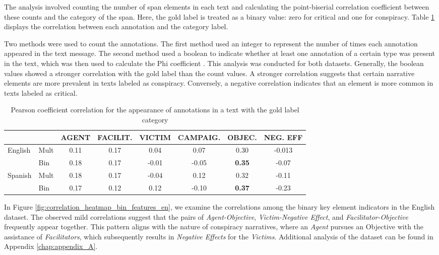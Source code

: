 \documentclass{Configuration_Files/PoliMi3i_thesis}
\begin{document}
The analysis involved counting the number of span elements in each text and calculating the point-biserial correlation coefficient \cite{brown2001point} between these counts and the category of the span. Here, the gold label is treated as a binary value: zero for critical and one for conspiracy. Table \ref{tab:pearson_coeff_corr_span_texts} displays the correlation between each annotation and the category label.

Two methods were used to count the annotations. The first method used an integer to represent the number of times each annotation appeared in the text message. The second method used a boolean to indicate whether at least one annotation of a certain type was present in the text, which was then used to calculate the Phi coefficient \cite{ekstrom2011phi}. This analysis was conducted for both datasets. Generally, the boolean values showed a stronger correlation with the gold label than the count values. A stronger correlation suggests that certain narrative elements are more prevalent in texts labeled as conspiracy. Conversely, a negative correlation indicates that an element is more common in texts labeled as critical.

\begin{table}[H]
\centering
\small
\begin{tabular}{ll|cccccc}
\hline
        &         & AGENT & FACILIT. & VICTIM & CAMPAIG. & OBJEC. & NEG. EFF    \\
\hline
English & Mult    & 0.11  & 0.17   & 0.04   & 0.07  & 0.30   & -0.013           \\
        & Bin     & 0.18  & 0.17   & -0.01  & -0.05 & \textbf{0.35}   & -0.07   \\
\hline
Spanish & Mult    & 0.18  & 0.17   & -0.04  & 0.12  & 0.32   & -0.11            \\
        & Bin     & 0.17  & 0.12   & 0.12   & -0.10 & \textbf{0.37}   & -0.23   \\
\hline
\end{tabular}
\caption{\small Pearson coefficient correlation for the appearance of annotations in a text with the gold label category}
\label{tab:pearson_coeff_corr_span_texts}
\end{table}
\FloatBarrier


In Figure \ref{fig:correlation_heatmap_bin_features_en}, we examine the correlations among the binary key element indicators in the English dataset. The observed mild correlations suggest that the pairs of \textit{Agent-Objective}, \textit{Victim-Negative Effect}, and \textit{Facilitator-Objective} frequently appear together. This pattern aligns with the nature of conspiracy narratives, where an \textit{Agent} pursues an Objective with the assistance of \textit{Facilitators}, which subsequently results in \textit{Negative Effects} for the \textit{Victims}. Additional analysis of the dataset can be found in Appendix \ref{chap:appendix_A}.
\end{document}
